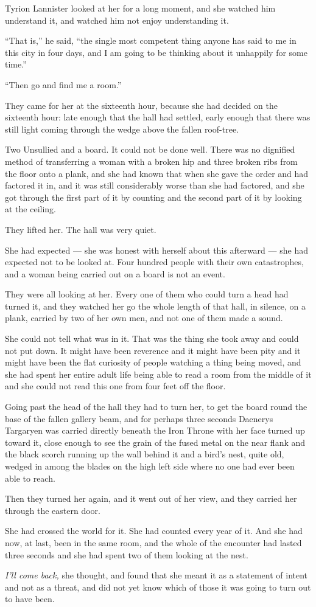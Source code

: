 Tyrion Lannister looked at her for a long moment, and she watched him understand it, and watched him not enjoy understanding it.

“That is,” he said, “the single most competent thing anyone has said to me in this city in four days, and I am going to be thinking about it unhappily for some time.”

“Then go and find me a room.”

\sceneBreak

They came for her at the sixteenth hour, because she had decided on the sixteenth hour: late enough that the hall had settled, early enough that there was still light coming through the wedge above the fallen roof-tree.

Two Unsullied and a board. It could not be done well. There was no dignified method of transferring a woman with a broken hip and three broken ribs from the floor onto a plank, and she had known that when she gave the order and had factored it in, and it was still considerably worse than she had factored, and she got through the first part of it by counting and the second part of it by looking at the ceiling.

They lifted her. The hall was very quiet.

She had expected — she was honest with herself about this afterward — she had expected not to be looked at. Four hundred people with their own catastrophes, and a woman being carried out on a board is not an event.

They were all looking at her. Every one of them who could turn a head had turned it, and they watched her go the whole length of that hall, in silence, on a plank, carried by two of her own men, and not one of them made a sound.

She could not tell what was in it. That was the thing she took away and could not put down. It might have been reverence and it might have been pity and it might have been the flat curiosity of people watching a thing being moved, and she had spent her entire adult life being able to read a room from the middle of it and she could not read this one from four feet off the floor.

Going past the head of the hall they had to turn her, to get the board round the base of the fallen gallery beam, and for perhaps three seconds Daenerys Targaryen was carried directly beneath the Iron Throne with her face turned up toward it, close enough to see the grain of the fused metal on the near flank and the black scorch running up the wall behind it and a bird’s nest, quite old, wedged in among the blades on the high left side where no one had ever been able to reach.

Then they turned her again, and it went out of her view, and they carried her through the eastern door.

She had crossed the world for it. She had counted every year of it. And she had now, at last, been in the same room, and the whole of the encounter had lasted three seconds and she had spent two of them looking at the nest.

\textit{I’ll come back,} she thought, and found that she meant it as a statement of intent and not as a threat, and did not yet know which of those it was going to turn out to have been.